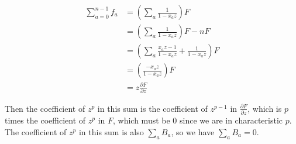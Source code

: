 \documentclass{article}
\numberwithin{equation}{section}
\begin{document}
\begin{align*}
\sum_{a=0}^{n-1} f_a&=\left(\sum_a \frac{1}{1-x_az}\right)F\\
&=\left(\sum_a \frac{1}{1-x_az}\right)F-nF\\
&=\left(\sum_a\frac{x_az-1}{1-x_az}+ \frac{1}{1-x_az}\right)F\\
&=\left(\frac{-x_az}{1-x_az}\right)F\\
&=z\frac{\partial F}{\partial z}
\end{align*}

Then the coefficient of $z^p$ in this sum is the coefficient of $z^{p-1}$ in $\frac{\partial F}{\partial z}$, which is $p$ times the coefficient of $z^p$ in $F$, which must be $0$ since we are in characteristic $p$. The coefficient of $z^p$ in this sum is also $\sum_a B_a$, so we have $\sum_a B_a=0$. 
\end{document}
